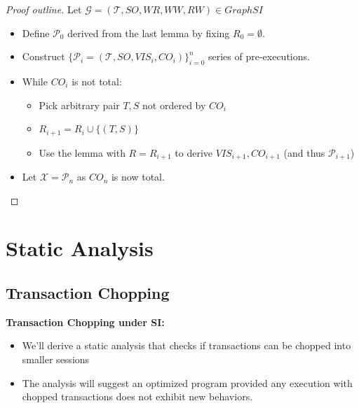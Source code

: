 \documentclass{beamer}
\begin{document}
\begin{frame}
	\begin{proof}[Proof outline]
		Let $\mathcal{G} = (\mathcal{T}, SO, WR, WW, RW) \in GraphSI$
		\begin{itemize}
			\item Define $\mathcal{P}_0$ derived from the last lemma by fixing $R_0 = \emptyset$.
			\item Construct $\{\mathcal{P}_i = (\mathcal{T}, SO, VIS_i, CO_i)\}^n_{i=0}$ series of pre-executions.
			\item While $CO_i$ is not total:
			\begin{itemize}
				\item Pick arbitrary pair $T,S$ not ordered by $CO_i$
				\item $R_{i+1} = R_i \cup \{(T,S)\}$
				\item Use the lemma with $R = R_{i+1}$ to derive $VIS_{i+1}, CO_{i+1}$ (and thus $\mathcal{P}_{i+1}$)
			\end{itemize}
			\item Let $\mathcal{X} = \mathcal{P}_n$ as $CO_n$ is now total.	
		\end{itemize}
	\end{proof}
\end{frame}

\section{Static Analysis}
\subsection{Transaction Chopping}

\begin{frame}
	\textbf{Transaction Chopping under SI:}
	\begin{itemize}
		\item We'll derive a static analysis that checks if transactions can be chopped into smaller sessions
		\item The analysis will suggest an optimized program provided any execution with chopped transactions does not exhibit new behaviors.
	\end{itemize}
\end{frame}
\end{document}
